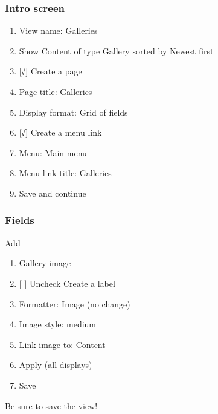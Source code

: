 \documentclass[letterpaper,10pt,english]{sphinxmanual}
\begin{document}
\subsubsection{Intro screen}
\label{recipe:intro-screen}\begin{enumerate}
\item {} 
View name: Galleries

\item {} 
Show Content of type Gallery sorted by Newest first

\item {} 
{[}√{]}  Create a page

\item {} 
Page title: Galleries

\item {} 
Display format: Grid of fields

\item {} 
{[}√{]}  Create a menu link

\item {} 
Menu: Main menu

\item {} 
Menu link title: Galleries

\item {} 
Save and continue

\end{enumerate}


\subsubsection{Fields}
\label{recipe:fields}
Add
\begin{enumerate}
\item {} 
Gallery image

\item {} 
{[}  {]}  Uncheck Create a label

\item {} 
Formatter: Image (no change)

\item {} 
Image style: medium

\item {} 
Link image to: Content

\item {} 
Apply (all displays)

\item {} 
Save

\end{enumerate}

Be sure to save the view!
\end{document}
